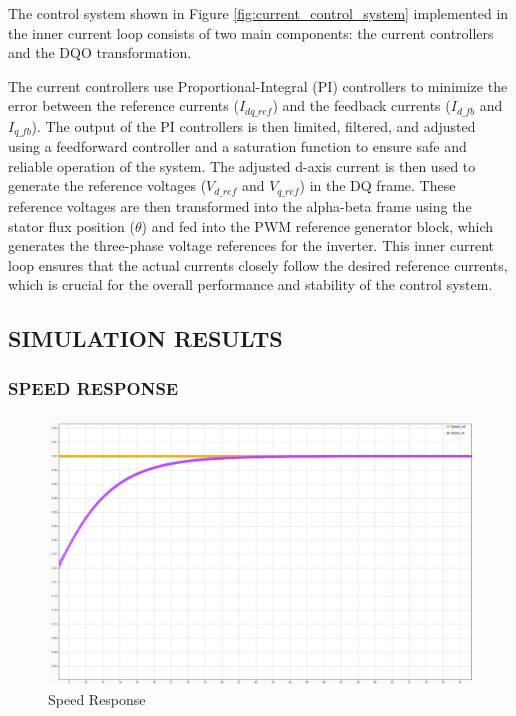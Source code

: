 The control system shown in Figure \ref{fig:current_control_system} implemented in the inner current loop consists of two main components: the current controllers and the DQO transformation.

The current controllers use Proportional-Integral (PI) controllers to minimize the error between the reference currents ($I_{dq\_{ref}}$) and the feedback currents ($I_{d\_fb}$ and $I_{q\_fb}$). The output of the PI controllers is then limited, filtered, and adjusted using a feedforward controller and a saturation function to ensure safe and reliable operation of the system. The adjusted d-axis current is then used to generate the reference voltages ($V_{d\_{ref}}$ and $V_{q\_{ref}}$) in the DQ frame. These reference voltages are then transformed into the alpha-beta frame using the stator flux position ($\theta$) and fed into the PWM reference generator block, which generates the three-phase voltage references for the inverter. This inner current loop ensures that the actual currents closely follow the desired reference currents, which is crucial for the overall performance and stability of the control system.



\subsection{SIMULATION RESULTS}

\subsubsection{SPEED RESPONSE}

\begin{figure}[H]
	\centering
	\includegraphics[width=6in]{sections/section3/images/simulationResutls/SpeedTrackingNoCursor.png}
	\caption{Speed Response}
	\label{fig:speed_response}
\end{figure}

